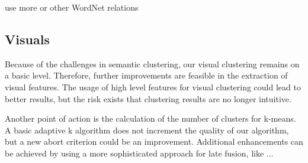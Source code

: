 use more or other WordNet relations

\subsection{Visuals}

Because of the challenges in semantic clustering, our visual clustering remains on a basic level. Therefore, further improvements are feasible in the extraction of visual features. The usage of high level features for visual clustering could lead to better results, but the risk exists that clustering results are no longer intuitive. 

Another point of action is the calculation of the number of clusters for k-means. A basic adaptive k algorithm does not increment the quality of our algorithm, but a new abort criterion could be an improvement. Additional enhancements can be achieved by using a more sophisticated approach for late fusion, like ... 